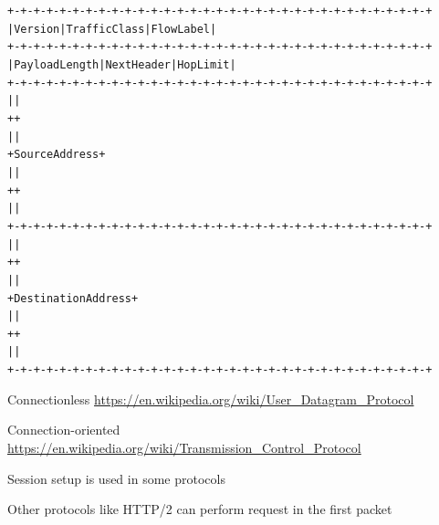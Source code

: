 \documentclass[Screen16to9,17pt]{foils}
\begin{document}
\vskip -1cm
\begin{alltt}\footnotesize
   +-+-+-+-+-+-+-+-+-+-+-+-+-+-+-+-+-+-+-+-+-+-+-+-+-+-+-+-+-+-+-+-+
   |Version| Traffic Class |           Flow Label                  |
   +-+-+-+-+-+-+-+-+-+-+-+-+-+-+-+-+-+-+-+-+-+-+-+-+-+-+-+-+-+-+-+-+
   |         Payload Length        |  Next Header  |   Hop Limit   |
   +-+-+-+-+-+-+-+-+-+-+-+-+-+-+-+-+-+-+-+-+-+-+-+-+-+-+-+-+-+-+-+-+
   |                                                               |
   +                                                               +
   |                                                               |
   +                         Source Address                        +
   |                                                               |
   +                                                               +
   |                                                               |
   +-+-+-+-+-+-+-+-+-+-+-+-+-+-+-+-+-+-+-+-+-+-+-+-+-+-+-+-+-+-+-+-+
   |                                                               |
   +                                                               +
   |                                                               |
   +                      Destination Address                      +
   |                                                               |
   +                                                               +
   |                                                               |
   +-+-+-+-+-+-+-+-+-+-+-+-+-+-+-+-+-+-+-+-+-+-+-+-+-+-+-+-+-+-+-+-+
\end{alltt}

Connectionless \url{https://en.wikipedia.org/wiki/User_Datagram_Protocol}



Connection-oriented \url{https://en.wikipedia.org/wiki/Transmission_Control_Protocol}




\begin{list2}
\item Session setup is used in some protocols
\item Other protocols like HTTP/2 can perform request in the first packet
\end{list2}
\end{document}
